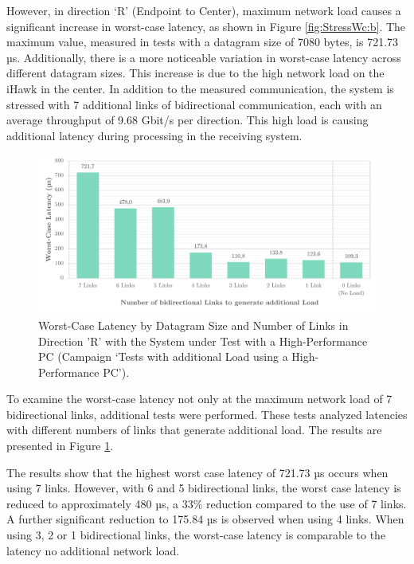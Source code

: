 However, in direction `R' (Endpoint to Center), maximum network load causes a significant increase in worst-case latency, as shown in Figure \ref{fig:StressWc:b}. The maximum value, measured in tests with a datagram size of 7080 bytes, is 721.73 µs. Additionally, there is a more noticeable variation in worst-case latency across different datagram sizes. This increase is due to the high network load on the iHawk in the center. In addition to the measured communication, the system is stressed with 7 additional links of bidirectional communication, each with an average throughput of 9.68 Gbit/s per direction. This high load is causing additional latency during processing in the receiving system.

\begin{figure}[h!]
    \centering
    \includegraphics[width=1\linewidth]{figures/performance/d_13.pdf}
    \caption{Worst-Case Latency by Datagram Size and Number of Links in Direction 'R' with the System under Test with a High-Performance PC (Campaign `Tests with additional Load using a High-Performance PC').}
    \label{fig:NetLoadLinkReduction}
\end{figure}

To examine the worst-case latency not only at the maximum network load of 7 bidirectional links, additional tests were performed. These tests analyzed latencies with different numbers of links that generate additional load. The results are presented in Figure \ref{fig:NetLoadLinkReduction}.

The results show that the highest worst case latency of 721.73 µs occurs when using 7 links. However, with 6 and 5 bidirectional links, the worst case latency is reduced to approximately 480 µs, a 33\% reduction compared to the use of 7 links. A further significant reduction to 175.84 µs is observed when using 4 links. When using 3, 2 or 1 bidirectional links, the worst-case latency is comparable to the latency no additional network load.

